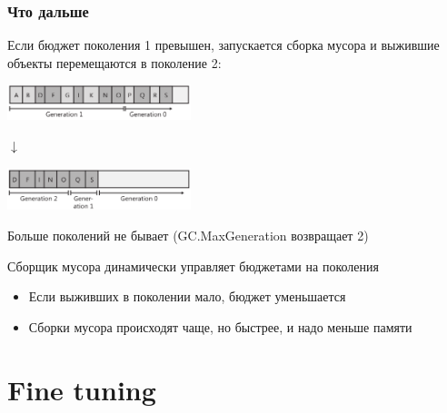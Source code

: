 \documentclass[xetex,mathserif,serif]{beamer}
\begin{document}
    \begin{frame}
        \frametitle{Что дальше}
        Если бюджет поколения 1 превышен, запускается сборка мусора и выжившие объекты перемещаются в поколение 2:
        \begin{center}
            \includegraphics[width=0.4\textwidth]{generation1full.png}
        \end{center}
        
        \vspace{-7mm}
        
        \begin{center}\begin{LARGE}$\downarrow$\end{LARGE}\end{center}
    
        \vspace{-7mm}
    
        \begin{center}
            \includegraphics[width=0.4\textwidth]{generation2.png}
        \end{center}
        Больше поколений не бывает (GC.MaxGeneration возвращает 2)

        Сборщик мусора динамически управляет бюджетами на поколения
        \begin{itemize}
            \item Если выживших в поколении мало, бюджет уменьшается
            \item Сборки мусора происходят чаще, но быстрее, и надо меньше памяти
        \end{itemize}
    \end{frame}

    \section{Fine tuning}
\end{document}

